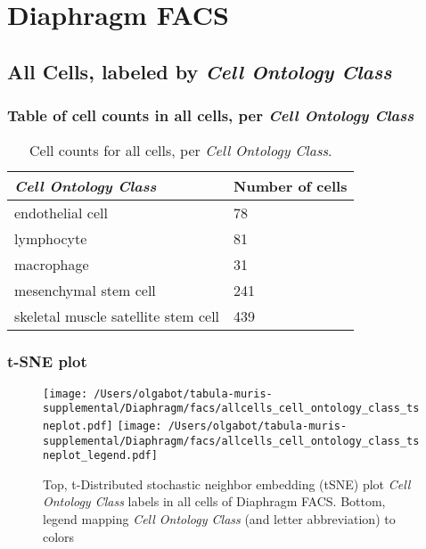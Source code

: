 \clearpage
\section{Diaphragm FACS}

\subsection{All Cells, labeled by \emph{Cell Ontology Class}}
\subsubsection{Table of cell counts in all cells, per \emph{Cell Ontology Class}}\begin{table}[h]
\centering
\label{my-label}
\begin{tabular}{@{}ll@{}}
\toprule

\emph{Cell Ontology Class}& Number of cells \\ \midrule
endothelial cell & 78 \\

lymphocyte & 81 \\

macrophage & 31 \\

mesenchymal stem cell & 241 \\

skeletal muscle satellite stem cell & 439 \\
\bottomrule
\end{tabular}
\caption{Cell counts for all cells, per \emph{Cell Ontology Class}.}
\end{table}

\clearpage
\subsubsection{t-SNE plot}
\begin{figure}[h]
\centering
\texttt{[image: /Users/olgabot/tabula-muris-supplemental/Diaphragm/facs/allcells\_cell\_ontology\_class\_tsneplot.pdf]}
\texttt{[image: /Users/olgabot/tabula-muris-supplemental/Diaphragm/facs/allcells\_cell\_ontology\_class\_tsneplot\_legend.pdf]}
\caption{Top, t-Distributed stochastic neighbor embedding (tSNE) plot  \emph{Cell Ontology Class} labels in all cells of Diaphragm FACS. Bottom, legend mapping \emph{Cell Ontology Class} (and letter abbreviation) to colors}
\end{figure}


\clearpage

